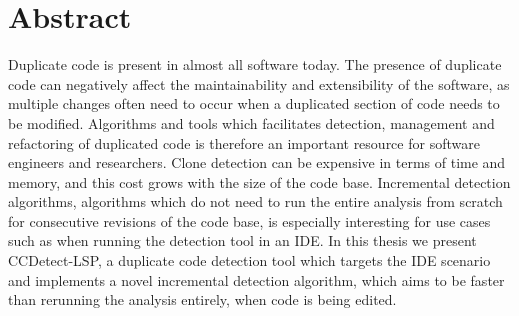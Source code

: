 \chapter*{Abstract}

Duplicate code is present in almost all software today. The presence of duplicate code can
negatively affect the maintainability and extensibility of the software, as multiple
changes often need to occur when a duplicated section of code needs to be modified.
Algorithms and tools which facilitates detection, management and refactoring of duplicated
code is therefore an important resource for software engineers and researchers. Clone
detection can be expensive in terms of time and memory, and this cost grows with the size
of the code base. Incremental detection algorithms, algorithms which do not need to run
the entire analysis from scratch for consecutive revisions of the code base, is especially
interesting for use cases such as when running the detection tool in an IDE. In this
thesis we present CCDetect-LSP, a duplicate code detection tool which targets the IDE
scenario and implements a novel incremental detection algorithm, which aims to be faster
than rerunning the analysis entirely, when code is being edited.
